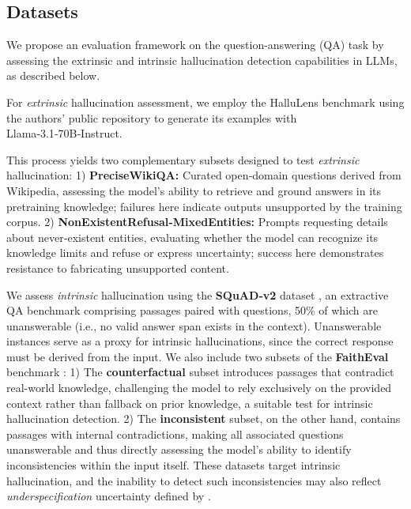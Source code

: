 \documentclass[letterpaper]{article} %
\begin{document}
\subsection{Datasets}



We propose an evaluation framework on the question-answering (QA) task by assessing the extrinsic and intrinsic hallucination detection capabilities in LLMs, as described below.


For \textit{extrinsic} hallucination assessment, we employ the HalluLens benchmark \cite{bang2025hallulensllmhallucinationbenchmark} using the authors' public repository to generate its examples with Llama‑3.1‑70B‑Instruct.

This process yields two complementary subsets designed to test \emph{extrinsic} hallucination: 1) \textbf{PreciseWikiQA:} Curated open‑domain questions derived from Wikipedia, assessing the model’s ability to retrieve and ground answers in its pretraining knowledge; failures here indicate outputs unsupported by the training corpus. 2) \textbf{NonExistentRefusal‑MixedEntities:} Prompts requesting details about never‑existent entities, evaluating whether the model can recognize its knowledge limits and refuse or express uncertainty; success here demonstrates resistance to fabricating unsupported content.



We assess \emph{intrinsic} hallucination using the \textbf{SQuAD‑v2} dataset \cite{rajpurkar2018knowdontknowunanswerable}, an extractive QA benchmark comprising passages paired with questions, 50\% of which are unanswerable (i.e., no valid answer span exists in the context). Unanswerable instances serve as a proxy for intrinsic hallucinations, since the correct response must be derived from the input. We also include two subsets of the \textbf{FaithEval} benchmark \cite{ming2025faithevallanguagemodelstay}: 1) The \textbf{counterfactual} subset introduces passages that contradict real-world knowledge, challenging the model to rely exclusively on the provided context rather than fallback on prior knowledge, a suitable test for intrinsic hallucination detection. 2) The \textbf{inconsistent} subset, on the other hand, contains passages with internal contradictions, making all associated questions unanswerable and thus directly assessing the model's ability to identify inconsistencies within the input itself.
These datasets target intrinsic hallucination, and the inability to detect such inconsistencies may also reflect \textit{underspecification} uncertainty defined by \cite{kirchhof2025positionuncertaintyquantificationneeds}.
\end{document}
